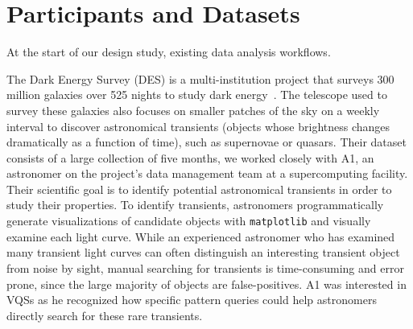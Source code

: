 \section{Participants and Datasets\label{sec:participantdatasets}}
 At the start of our design study,  existing data analysis workflows. 
\par\noindent{} The Dark Energy Survey (DES) is a multi-institution project that surveys 300 million galaxies over 525 nights to study dark energy~\cite{Drlica-Wagner2017}. The telescope used to survey these galaxies also focuses on smaller patches of the sky on a weekly interval to discover astronomical transients (objects whose brightness changes dramatically as a function of time), such as supernovae or quasars. Their dataset consists of a large collection of  five months, we worked closely with A1, an astronomer on the project's data management team at a supercomputing facility. Their scientific goal is to identify potential astronomical transients in order to study their properties. 
\npar To identify transients, astronomers programmatically generate visualizations of candidate objects with \texttt{matplotlib} and visually examine each light curve.  While an experienced astronomer who has examined many transient light curves can often distinguish an interesting transient object from noise by sight, manual searching for transients is time-consuming and error prone, since the large majority of objects are false-positives. A1 was interested in VQSs as he recognized how specific pattern queries could help astronomers directly search for these rare transients.
